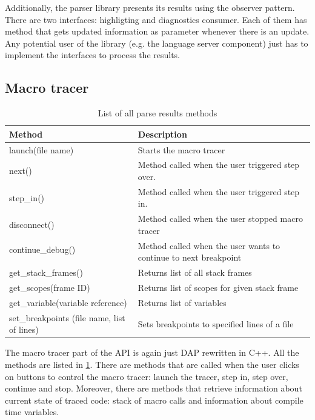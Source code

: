 Additionally, the parser library presents its results using the observer pattern. There are two interfaces: highligting and diagnostics consumer. Each of them has method  that gets updated information as parameter whenever there is an update. Any potential user of the library (e.g. the language server component) just has to implement the interfaces to process the results.

\subsection{Macro tracer}
\begin{table}
	\centering
	\begin{tabular}{ll}
		
		\toprule
		Method & Description \\ \midrule
		launch(file name) & Starts the macro tracer \\
	    next() & Method called when the user triggered step over. \\
		step\_in() & Method called when the user triggered step in. \\
		disconnect() & Method called when the user stopped macro tracer \\
		continue\_debug() & \multirow{2}{8cm}{Method called when the user wants to continue to next breakpoint} \\
		& \\
		
		get\_stack\_frames() & Returns list of all stack frames\\
		get\_scopes(frame ID) & Returns list of scopes for given stack frame \\
		get\_variable(variable reference) & Returns list of variables  \\
		
		
		set\_breakpoints (file name,
		list of lines) & Sets breakpoints to specified lines of a file \\ \bottomrule
	\end{tabular}
	
	\caption{List of all parse results methods}
	\label{macro_tracer_API}
\end{table}


The macro tracer part of the API is again just DAP rewritten in C++. All the methods are listed in \cref{macro_tracer_API}. There are methods that are called when the user clicks on buttons to control the macro tracer: launch the tracer, step in, step over, continue and stop. Moreover, there are methods that retrieve information about current state of traced code: stack of macro calls and information about compile time variables.

